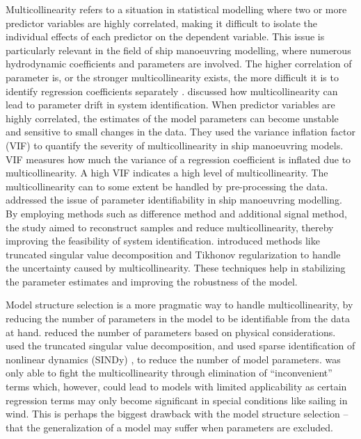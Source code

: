 Multicollinearity refers to a situation in statistical modelling where two or more predictor variables are highly correlated, making it difficult to isolate the individual effects of each predictor on the dependent variable. This issue is particularly relevant in the field of ship manoeuvring modelling, where numerous hydrodynamic coefficients and parameters are involved.
The higher correlation of parameter is, or the stronger multicollinearity exists, the more difficult it is to identify regression coefficients separately \cite{yoonIdentificationHydrodynamicCoefficients2003}.
\textcite{wangQuantifyingMulticollinearityShip2018} discussed how multicollinearity can lead to parameter drift in system identification. When predictor variables are highly correlated, the estimates of the model parameters can become unstable and sensitive to small changes in the data. They used the variance inflation factor (VIF) to quantify the severity of multicollinearity in ship manoeuvring models. VIF measures how much the variance of a regression coefficient is inflated due to multicollinearity. A high VIF indicates a high level of multicollinearity.
The multicollinearity can to some extent be handled by pre-processing the data.
\textcite{luoParameterIdentificationShip2016} addressed the issue of parameter identifiability in ship manoeuvring modelling. By employing methods such as difference method and additional signal method, the study aimed to reconstruct samples and reduce multicollinearity, thereby improving the feasibility of system identification.
\textcite{xuUncertaintyAnalysisHydrodynamic2019} introduced methods like truncated singular value decomposition and Tikhonov regularization to handle the uncertainty caused by multicollinearity. These techniques help in stabilizing the parameter estimates and improving the robustness of the model.

Model structure selection is a more pragmatic way to handle multicollinearity, by reducing the number of parameters in the model to be identifiable from the data at hand.  \textcite{luoParameterIdentificationShip2016} reduced the number of parameters based on physical considerations. \textcite{costaRobustParameterEstimation2021} used the truncated singular value decomposition, and \textcite{liuPhysicsinformedIdentificationMarine2024} used sparse identification of nonlinear dynamics (SINDy) \cite{bruntonDiscoveringGoverningEquations2016}, to reduce the number of model parameters. 
\textcite{abkowitzMEASUREMENTHYDRODYNAMICCHARACTERISTICS1980} was only able to fight the multicollinearity through elimination of “inconvenient” terms which, however, could lead to models with limited applicability as certain regression terms may only become significant in special conditions like sailing in wind. This is perhaps the biggest drawback with the model structure selection – that the generalization of a model may suffer when parameters are excluded.

